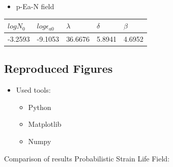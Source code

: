 \documentclass[11pt]{article}
\providecommand{\tightlist}{%
      \setlength{\itemsep}{0pt}\setlength{\parskip}{0pt}}
\begin{document}
\begin{itemize}
\tightlist
\item
  p-Ea-N field
\end{itemize}

\begin{longtable}[]{@{}lllll@{}}
\toprule
\(logN_0\) & \(log\epsilon_{a0}\) & \(\lambda\) & \(\delta\) &
\(\beta\)\tabularnewline
\midrule
\endhead
-3.2593 & -9.1053 & 36.6676 & 5.8941 & 4.6952\tabularnewline
\bottomrule
\end{longtable}

\hypertarget{reproduced-figures}{%
\subsection{Reproduced Figures}\label{reproduced-figures}}

\begin{itemize}
\tightlist
\item
  Used tools:

  \begin{itemize}
  \tightlist
  \item
    Python
  \item
    Matplotlib
  \item
    Numpy
  \end{itemize}
\end{itemize}

Comparison of results Probabilistic Strain Life Field:
\end{document}
